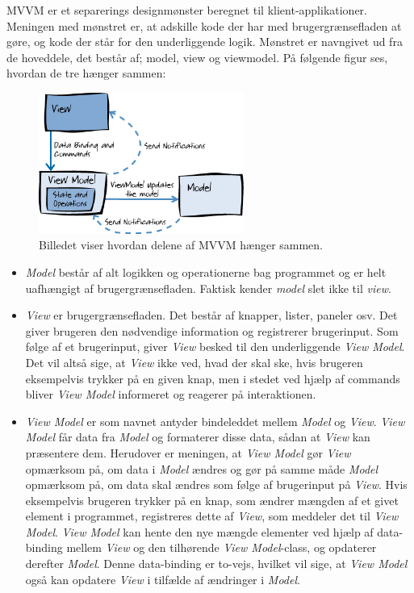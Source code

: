 MVVM er et separerings designmønster beregnet til klient-applikationer. Meningen med mønstret er, at adskille kode der har med brugergrænsefladen at gøre, og kode der står for den underliggende logik. Mønstret er navngivet ud fra de hoveddele, det består af; model, view og viewmodel. På følgende figur ses, hvordan de tre hænger sammen:

\begin{figure}[H]
\centering
\includegraphics[width=0.6\textwidth]{Billeder/MVVM.png}
\caption{Billedet viser hvordan delene af MVVM hænger sammen.\cite{msdn1}}
\label{MVVM1}
\end{figure}

\begin{itemize}

\item \textit{Model} består af alt logikken og operationerne bag programmet og er helt uafhængigt af brugergrænsefladen. Faktisk kender \textit{model} slet ikke til \textit{view}.

\item \textit{View} er brugergrænsefladen. Det består af knapper, lister, paneler osv. Det giver brugeren den nødvendige information og registrerer brugerinput. Som følge af et brugerinput, giver \textit{View} besked til den underliggende \textit{View Model}. Det vil altså sige, at \textit{View} ikke ved, hvad der skal ske, hvis brugeren eksempelvis trykker på en given knap, men i stedet ved hjælp af commands bliver \textit{View Model} informeret og reagerer på interaktionen.  

\item \textit{View Model} er som navnet antyder bindeleddet mellem \textit{Model} og \textit{View}. \textit{View Model} får data fra \textit{Model} og formaterer disse data, sådan at \textit{View} kan præsentere dem. Herudover er meningen, at \textit{View Model} gør \textit{View} opmærksom på, om data i \textit{Model} ændres og gør på samme måde \textit{Model} opmærksom på, om data skal ændres som følge af brugerinput på \textit{View}. Hvis eksempelvis brugeren trykker på en knap, som ændrer mængden af et givet element i programmet, registreres dette af \textit{View}, som meddeler det til \textit{View Model}. \textit{View Model} kan hente den nye mængde elementer ved hjælp af data-binding mellem \textit{View} og den tilhørende \textit{View Model}-class, og opdaterer derefter \textit{Model}. Denne data-binding er to-vejs, hvilket vil sige, at \textit{View Model} også kan opdatere \textit{View} i tilfælde af ændringer i \textit{Model}.

\end{itemize}

